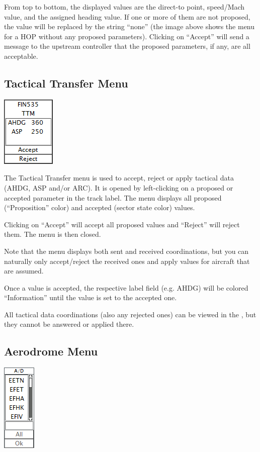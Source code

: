 \documentclass[11pt,a4paper]{memoir}
\begin{document}
From top to bottom, the displayed values are the direct-to point, speed/Mach value, and the assigned heading value. If one or more of them are not proposed, the value will be replaced by the string “none” (the image above shows the menu for a HOP without any proposed parameters). Clicking on “Accept” will send a message to the upstream controller that the proposed parameters, if any, are all acceptable.

\subsection{Tactical Transfer Menu}
\label{menu:ttm}
\includegraphics{img/ttm.png}

The Tactical Transfer menu is used to accept, reject or apply tactical data (AHDG, ASP and/or ARC). It is opened by left-clicking on a proposed or accepted parameter in the track label. The menu displays all proposed (“Proposition” color) and accepted (sector state color) values.

Clicking on “Accept” will accept all proposed values and “Reject” will reject them. The menu is then closed.

Note that the menu displays both sent and received coordinations, but you can naturally only accept/reject the received ones and apply values for aircraft that are assumed.

Once a value is accepted, the respective label field (e.g. AHDG) will be colored “Information” until the value is set to the accepted one.

All tactical data coordinations (also any rejected ones) can be viewed in the \textit{}, but they cannot be answered or applied there.

\subsection{Aerodrome Menu}
\label{menu:ad}
\includegraphics{img/ad.png}
\end{document}
